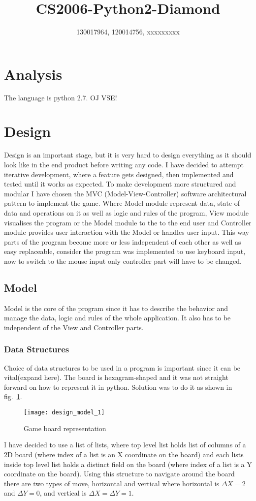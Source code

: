\documentclass{article}
\title{CS2006-Python2-Diamond}
\author{130017964, 120014756, xxxxxxxxx}
\begin{document}
\maketitle

\section{Analysis}
The language is python 2.7. OJ VSE!
\section{Design}
Design is an important stage, but it is very hard to design everything as it should look like in the end product before writing any code. I have decided to attempt iterative development, where a feature gets designed, then implemented and tested until it works as expected. To make development more structured and modular I have chosen the MVC (Model-View-Controller) software architectural pattern to implement the game. Where Model module represent data, state of data and operations on it as well as logic and rules of the program, View module visualises the program or the Model module to the to the end user and Controller module provides user interaction with the Model or handles user input. This way parts of the program become more or less independent of each other as well as easy replaceable, consider the program was implemented to use keyboard input, now to switch to the mouse input only controller part will have to be changed.
\subsection{Model}
Model is the core of the program since it has to describe the behavior and manage the data, logic and rules of the whole application. It also has to be independent of the View and Controller parts.
\subsubsection{Data Structures}
Choice of data structures to be used in a program is important since it can be vital(expand here). The board is hexagram-shaped and it was not straight forward on how to represent it in python. Solution was to do it as shown in fig.~\ref{fig:boardgrid}.
\begin{figure}[H]
  \centering
    \texttt{[image: design\_model\_1]}
  \caption{Game board representation}
  \label{fig:boardgrid}
\end{figure}
I have decided to use a list of lists, where top level list holds list of columns of a 2D board (where index of a list is an X coordinate on the board) and each lists inside top level list holds a distinct field on the board (where index of a list is a Y coordinate on the board). Using this structure to navigate around the board there are two types of move, horizontal and vertical where horizontal is $\Delta X = 2$ and $\Delta Y = 0$, and vertical is $\Delta X = \Delta Y = 1$.
\end{document}
